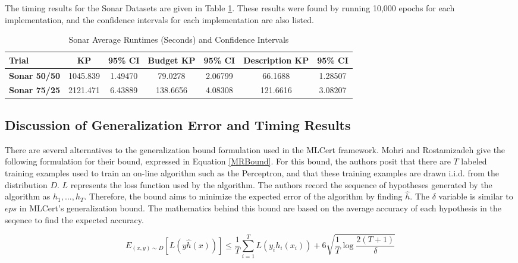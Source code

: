The timing results for the Sonar Datasets are given in Table \ref{tab:sonartabtiming}. These results were found by running 10,000 epochs for each implementation, and the confidence intervals for each implementation are also listed.

\begin{table}[ht]
 \begin{center}
  \caption{Sonar Average Runtimes (Seconds) and Confidence Intervals}
  \label{tab:sonartabtiming}
  \begin{tabular}{l|c|c|c|c|c|c}
  \textbf{Trial} & \textbf{KP} & \textbf{95\% CI} & \textbf{Budget KP} & \textbf{95\% CI} & \textbf{Description KP} & \textbf{95\% CI}\\
  \hline
  \textbf{Sonar 50/50} & 1045.839 & 1.49470 & 79.0278 & 2.06799 & 66.1688 & 1.28507\\
  \textbf{Sonar 75/25} & 2121.471 & 6.43889 & 138.6656 & 4.08308 & 121.6616 & 3.08207\\
  \end{tabular}
 \end{center}
\end{table}

\subsection{Discussion of Generalization Error and Timing Results}\label{ResultsDiscussion}
There are several alternatives to the generalization bound formulation used in the MLCert framework. Mohri and Rostamizadeh \cite{MR13} give the following formulation for their bound, expressed in Equation \ref{MRBound}. For this bound, the authors posit that there are $T$ labeled training examples used to train an on-line algorithm such as the Perceptron, and that these training examples are drawn i.i.d. from the distribution $D$. $L$ represents the loss function used by the algorithm. The authors record the sequence of hypotheses generated by the algorithm as $h_1,...,h_T$. Therefore, the bound aims to minimize the expected error of the algorithm by finding $\hat{h}$. The $\delta$ variable is similar to $eps$ in MLCert's generalization bound. The mathematics behind this bound are based on the average accuracy of each hypothesis in the seqence to find the expected accuracy.

\begin{equation} \label{MRBound}
 E_{(x,y)\sim D}[L(y\hat{h}(x))] \leq \frac{1}{T} \sum_{i=1}^{T} L(y_i h_i(x_i)) + 6\sqrt{\frac{1}{T}\log \frac{2(T+1)}{\delta}} 
\end{equation}

